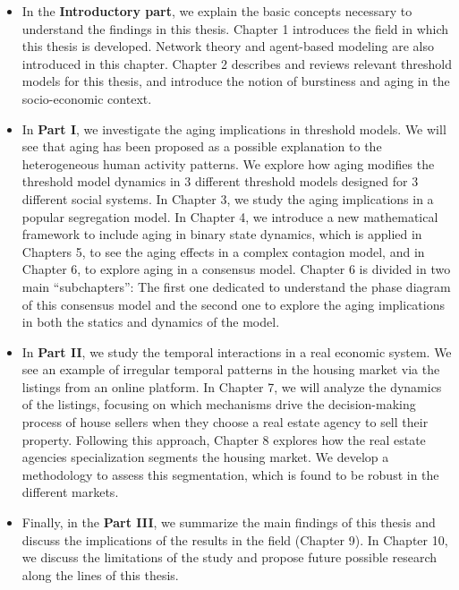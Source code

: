 \begin{itemize}
    \item In the \textbf{Introductory part}, we explain the basic concepts necessary to understand the findings in this thesis. Chapter 1 introduces the field in which this thesis is developed. Network theory and agent-based modeling are also introduced in this chapter. Chapter 2 describes and reviews relevant threshold models for this thesis, and introduce the notion of burstiness and aging in the socio-economic context. 

    \item In \textbf{Part I}, we investigate the aging implications in threshold models. We will see that aging has been proposed as a possible explanation to the heterogeneous human activity patterns. We explore how aging modifies the threshold model dynamics in 3 different threshold models designed for 3 different social systems. In Chapter 3, we study the aging implications in a popular segregation model. In Chapter 4, we introduce a new mathematical framework to include aging in binary state dynamics, which is applied in Chapters 5, to see the aging effects in a complex contagion model, and in Chapter 6, to explore aging in a consensus model. Chapter 6 is divided in two main ``subchapters'': The first one dedicated to understand the phase diagram of this consensus model and the second one to explore the aging implications in both the statics and dynamics of the model.
    
    \item In \textbf{Part II}, we study the temporal interactions in a real economic system. We see an example of irregular temporal patterns in the housing market via the listings from an online platform. In Chapter 7, we will analyze the dynamics of the listings, focusing on which mechanisms drive the decision-making process of house sellers when they choose a real estate agency to sell their property. Following this approach, Chapter 8 explores how the real estate agencies specialization segments the housing market. We develop a methodology to assess this segmentation, which is found to be robust in the different markets.
    
    \item Finally, in the \textbf{Part III}, we summarize the main findings of this thesis and discuss the implications of the results in the field (Chapter 9). In Chapter 10, we discuss the limitations of the study and propose future possible research along the lines of this thesis.
\end{itemize}